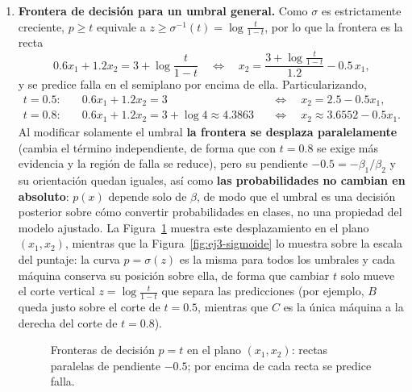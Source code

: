 \begin{enumerate}
\item \textbf{Frontera de decisión para un umbral general.}
Como $\sigma$ es estrictamente creciente, $p\ge t$ equivale a
$z\ge\sigma^{-1}(t)=\log\frac{t}{1-t}$, por lo que la frontera es la
recta
\[
    0.6x_1 + 1.2x_2 = 3 + \log\frac{t}{1-t}
    \quad\Longleftrightarrow\quad
    x_2 = \frac{3+\log\frac{t}{1-t}}{1.2} - 0.5\,x_1 ,
\]
y se predice falla en el semiplano por encima de ella. Particularizando,
\[
    \begin{aligned}
    t=0.5:&\quad 0.6x_1+1.2x_2 = 3 &&\Longleftrightarrow\quad x_2 = 2.5 - 0.5x_1,\\
    t=0.8:&\quad 0.6x_1+1.2x_2 = 3+\log 4 \approx 4.3863 &&\Longleftrightarrow\quad x_2 \approx 3.6552 - 0.5x_1.
    \end{aligned}
\]
Al modificar solamente el umbral \textbf{la frontera se desplaza
paralelamente} (cambia el término independiente, de forma que con
$t=0.8$ se exige más evidencia y la región de falla se reduce), pero su
pendiente $-0.5=-\beta_1/\beta_2$ y su orientación quedan iguales, así
como \textbf{las probabilidades no cambian en absoluto}: $p(x)$ depende
solo de $\beta$, de modo que el umbral es una decisión posterior sobre
cómo convertir probabilidades en clases, no una propiedad del modelo
ajustado. La Figura~\ref{fig:ej3-fronteras} muestra este desplazamiento
en el plano $(x_1,x_2)$, mientras que la Figura~\ref{fig:ej3-sigmoide}
lo muestra sobre la escala del puntaje: la curva $p=\sigma(z)$ es la
misma para todos los umbrales y cada máquina conserva su posición sobre
ella, de forma que cambiar $t$ solo mueve el corte vertical
$z=\log\frac{t}{1-t}$ que separa las predicciones (por ejemplo, $B$
queda justo sobre el corte de $t=0.5$, mientras que $C$ es la única
máquina a la derecha del corte de $t=0.8$).

\begin{figure}[H]
\centering
{}
\caption{Fronteras de decisión $p=t$ en el plano $(x_1,x_2)$: rectas
paralelas de pendiente $-0.5$; por encima de cada recta se predice falla.}
\label{fig:ej3-fronteras}
\end{figure}


\end{enumerate}
